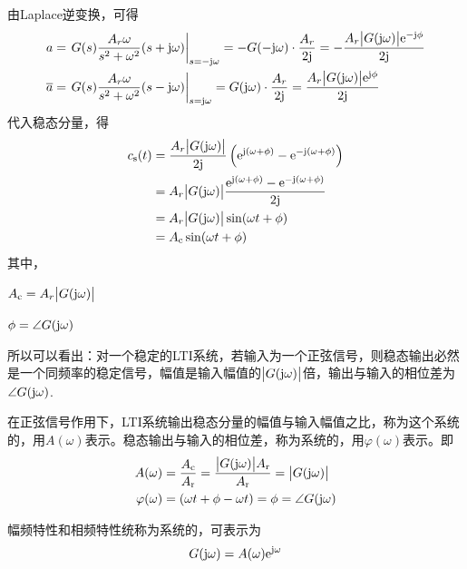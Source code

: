 由Laplace逆变换，可得
\begin{align}
	a &= \left. G(s)\dfrac{A_r \omega}{s^2 + \omega^2}(s + \text{j} \omega)\right|_{s = -\text{j} \omega} = -G(- \text{j} \omega )\cdot \dfrac{A_r}{2 \text{j}} = - \dfrac{A_r \big|G(\text{j} \omega)\big|{\rm{e}}^{-\text{j} \phi}}{2\text{j}}\\
	\overline{a} &=  \left. G(s)\dfrac{A_r \omega}{s^2 + \omega^2}(s - \text{j} \omega)\right|_{s = \text{j} \omega} = G( \text{j} \omega )\cdot \dfrac{A_r}{2 \text{j}} =  \dfrac{A_r \big|G(\text{j} \omega)\big|{\rm{e}}^{\text{j} \phi}}{2\text{j}}
\end{align}
代入稳态分量，得
\begin{align}
	c_{\text{s}}(t) &= \dfrac{A_r \big|G(\text{j} \omega)\big|}{2 \text{j}}\left({\rm{e}}^{\text{j} (\omega + \phi)} - {\rm{e}}^{- \text{j} (\omega + \phi)}\right)\notag\\
	& = A_r \big|G(\text{j} \omega)\big|\dfrac{{\rm{e}}^{\text{j} (\omega + \phi)} - {\rm{e}}^{- \text{j} (\omega + \phi)}}{2 \text{j}}\notag\\
	& = A_r \big|G(\text{j} \omega)\big| \sin(\omega t + \phi)\\
	& = A_\text{c} \sin (\omega t + \phi)
\end{align}
 其中，
 \begin{myitemize}
 	\item $A_\text{c} = A_r \big|G(\text{j} \omega)\big|$\vspace*{-0.5em}
 	\item $\phi = \angle G(\text{j} \omega)$\vspace*{0.3em}
 \end{myitemize}
\vspace*{0.5em}
所以可以看出：对一个稳定的LTI系统，若输入为一个正弦信号，则稳态输出必然是一个同频率的稳定信号，幅值是输入幅值的$\big|G(\text{j} \omega)\big|$倍，输出与输入的相位差为$\angle G(\text{j} \omega)$.
\vspace*{0.5em}

在正弦信号作用下，LTI系统输出稳态分量的幅值与输入幅值之比，称为这个系统的，用$A(\omega)$表示。稳态输出与输入的相位差，称为系统的，用$\varphi(\omega)$表示。即
\vspace*{0.5em}
\begin{align}
	A(\omega) &= \dfrac{A_{\text{c}}}{A_{\text{r}}} = \dfrac{\big|G(\text{j} \omega)\big|A_\text{r}}{A_\text{r}} = \big|G(\text{j} \omega)\big|\\
	\varphi(\omega) &= (\omega t + \phi - \omega t) = \phi = \angle G(\text{j} \omega)
\end{align}

\noindent 幅频特性和相频特性统称为系统的，可表示为
\begin{align}
	G(\text{j} \omega) = A(\omega) {\rm{e}}^{\text{j} \omega}
\end{align}
\vspace*{-3em}

